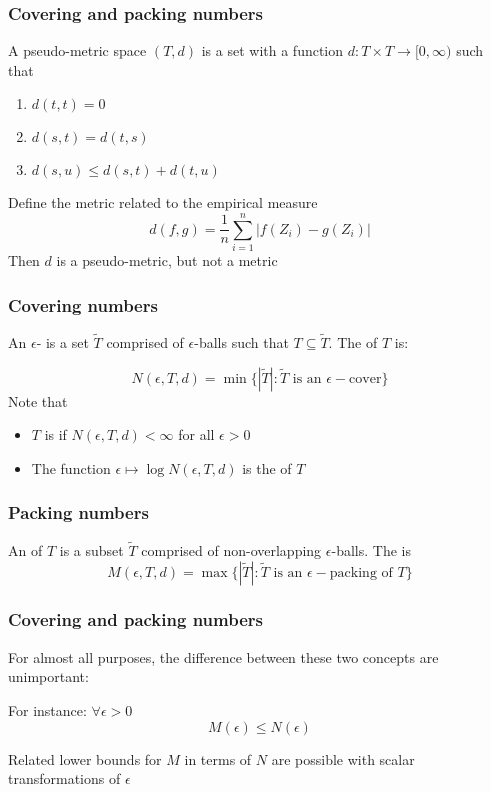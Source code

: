 \documentclass[12pt]{beamer}
\begin{document}
\begin{frame}[fragile]
\frametitle{Covering and packing numbers}
A pseudo-metric space $(T,d)$ is a set with a function $d:T\times T \rightarrow [0,\infty)$ such that
\begin{enumerate}
\item $d(t,t) = 0$
\item $d(s,t) = d(t,s)$
\item $d(s,u) \leq d(s,t) + d(t,u)$
\end{enumerate} 
\vsp

 Define the metric related to the empirical measure
\[
d(f,g) = \frac{1}{n}\sum_{i=1}^n |f(Z_i) - g(Z_i)|
\]
Then $d$ is a pseudo-metric, but not a metric
\end{frame}


\begin{frame}[fragile]
\frametitle{Covering numbers}
An $\epsilon$- is a set $\tilde{T}$ comprised of $\epsilon$-balls such that $T \subseteq \tilde{T}$.
The  of $T$ is:

\[
N(\epsilon,T,d) = \min\{|\tilde{T}|: \tilde{T} \textrm{ is an } \epsilon-\textrm{cover}\}
\]
Note that 
\begin{itemize}
\item $T$ is  if $N(\epsilon,T,d) < \infty$ for all $\epsilon > 0$
\item The function $\epsilon \mapsto \log N(\epsilon,T,d)$ is the  of $T$
\end{itemize}
\end{frame}

\begin{frame}[fragile]
\frametitle{Packing numbers}
An  of $T$ is a subset $\tilde{T}$ comprised of non-overlapping $\epsilon$-balls.
The  is
\[
M(\epsilon,T,d) = \max\{ |\tilde{T}| : \tilde{T} \textrm{ is an } \epsilon-\textrm{packing of } T\}
\]
\end{frame}

\begin{frame}[fragile]
\frametitle{Covering and packing numbers}
For almost all purposes, the difference between these two concepts are unimportant:

\vsp
For instance: $\forall \epsilon > 0$
\[
M(\epsilon) \leq N(\epsilon)
\]

\vsp
Related lower bounds for $M$ in terms of $N$ are possible with scalar transformations of $\epsilon$
\end{frame}
\end{document}
